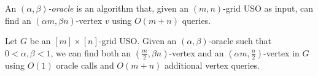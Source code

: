 \documentclass[runningheads,a4paper]{llncs}
\newtheorem{observation}{Observation}
\newcommand{\AT}[1]{\marginpar{\parbox{3.6cm}{{\small {\bf AT:} #1}}}} %
\begin{document}


An \emph{$(\alpha, \beta)$-oracle} is an algorithm that, given an $(m, n)$-grid USO as input, can find an $(\alpha m, \beta n)$-vertex $v$ using $O(m + n)$ queries.

\begin{lemma}\label{lemma:Climbing lemma}
Let $G$ be an $[m]\times [n]$-grid USO.
Given an $(\alpha, \beta)$-oracle such that $0 < \alpha, \beta  < 1$, we can find both an $(\frac{m}{2}, \beta n)$-vertex and an $(\alpha m, \frac{n}{2})$-vertex in $G$ using $O(1)$ oracle calls and $O(m+n)$ additional vertex queries.
\end{lemma}
\end{document}
